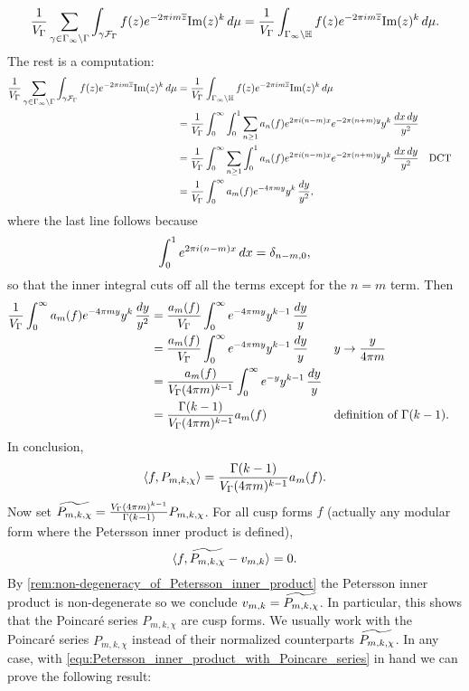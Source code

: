       \[
        \frac{1}{V_{\Gamma}}\sum_{\gamma \in \Gamma_{\infty}\backslash\Gamma}\int_{\gamma\mathcal{F}_{\Gamma}}f(z)e^{-2\pi im\overline{z}}\mathrm{Im}(z)^{k}\,d\mu = \frac{1}{V_{\Gamma}}\int_{\Gamma_{\infty}\backslash\mathbb{H}}f(z)e^{-2\pi im\overline{z}}\mathrm{Im}(z)^{k}\,d\mu.
      \]
      The rest is a computation:
      \begin{align*}
        \frac{1}{V_{\Gamma}}\sum_{\gamma \in \Gamma_{\infty}\backslash\Gamma}\int_{\gamma\mathcal{F}_{\Gamma}}f(z)e^{-2\pi im\overline{z}}\mathrm{Im}(z)^{k}\,d\mu &= \frac{1}{V_{\Gamma}}\int_{\Gamma_{\infty}\backslash\mathbb{H}}f(z)e^{-2\pi im\overline{z}}\mathrm{Im}(z)^{k}\,d\mu \\
        &= \frac{1}{V_{\Gamma}}\int_{0}^{\infty}\int_{0}^{1}\sum_{n \ge 1}a_{n}(f)e^{2\pi i(n-m)x}e^{-2\pi(n+m)y}y^{k}\,\frac{dx\,dy}{y^{2}} \\
        &= \frac{1}{V_{\Gamma}}\int_{0}^{\infty}\sum_{n \ge 1}\int_{0}^{1}a_{n}(f)e^{2\pi i(n-m)x}e^{-2\pi(n+m)y}y^{k}\,\frac{dx\,dy}{y^{2}} && \text{DCT} \\
        &= \frac{1}{V_{\Gamma}}\int_{0}^{\infty}a_{m}(f)e^{-4\pi my}y^{k}\,\frac{dy}{y^{2}},
      \end{align*}
      where the last line follows because
      \begin{equation}\label{equ:Dirac_integral_representation}
        \int_{0}^{1}e^{2\pi i(n-m)x}\,dx = \delta_{n-m,0},
      \end{equation}
      so that the inner integral cuts off all the terms except for the $n = m$ term. Then
      \begin{align*}
        \frac{1}{V_{\Gamma}}\int_{0}^{\infty}a_{m}(f)e^{-4\pi my}y^{k}\,\frac{dy}{y^{2}} &= \frac{a_{m}(f)}{V_{\Gamma}}\int_{0}^{\infty}e^{-4\pi my}y^{k-1}\,\frac{dy}{y} \\
        &= \frac{a_{m}(f)}{V_{\Gamma}}\int_{0}^{\infty}e^{-4\pi my}y^{k-1}\,\frac{dy}{y} && \text{$y \to \frac{y}{4\pi m}$} \\
        &= \frac{a_{m}(f)}{V_{\Gamma}(4\pi m)^{k-1}}\int_{0}^{\infty}e^{-y}y^{k-1}\,\frac{dy}{y} \\
        &= \frac{\Gamma(k-1)}{V_{\Gamma}(4\pi m)^{k-1}}a_{m}(f) && \text{definition of $\Gamma(k-1)$.}
      \end{align*}
      In conclusion,
      \begin{equation}\label{equ:Petersson_inner_product_with_Poincare_series}
        \langle f,P_{m,k,\chi}\rangle = \frac{\Gamma(k-1)}{V_{\Gamma}(4\pi m)^{k-1}}a_{m}(f).
      \end{equation}
      Now set $\widetilde{P_{m,k,\chi}} = \frac{V_{\Gamma}(4\pi m)^{k-1}}{\Gamma(k-1)}P_{m,k,\chi}$. For all cusp forms $f$ (actually any modular form where the Petersson inner product is defined),
      \[
        \langle f,\widetilde{P_{m,k,\chi}}-v_{m,k}\rangle = 0.
      \]
      By \cref{rem:non-degeneracy_of_Petersson_inner_product} the Petersson inner product is non-degenerate so we conclude $v_{m,k} = \widetilde{P_{m,k,\chi}}$. In particular, this shows that the Poincar\'e series $P_{m,k,\chi}$ are cusp forms. We usually work with the Poincar\'e series $P_{m,k,\chi}$ instead of their normalized counterparts $\widetilde{P_{m,k,\chi}}$. In any case, with \cref{equ:Petersson_inner_product_with_Poincare_series} in hand we can prove the following result:


